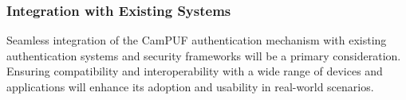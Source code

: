 \subsubsection{Integration with Existing Systems}

Seamless integration of the CamPUF authentication mechanism with existing authentication systems and security frameworks will be a primary consideration. Ensuring compatibility and interoperability with a wide range of devices and applications will enhance its adoption and usability in real-world scenarios.